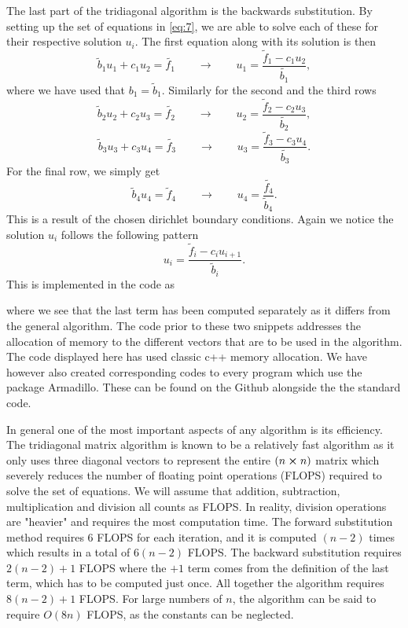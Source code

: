 \documentclass[a4paper,10pt]{article}
\begin{document}
The last part of the tridiagonal algorithm is the backwards substitution. By setting up the set of equations in \eqref{eq:7}, we are able to solve each of these for their respective solution $u_i$. The first equation along with its solution is then
\[
\tilde{b}_1 u_1 + c_1 u_2 = \tilde{f_1} \qquad \rightarrow \qquad u_1 = \frac{\tilde{f}_1 - c_1 u_2}{\tilde{b_1}},
\]
where we have used that $b_1 = \tilde{b}_1$. Similarly for the second and the third rows
\[
\tilde{b}_2 u_2 + c_2 u_3 = \tilde{f_2} \qquad \rightarrow \qquad u_2 = \frac{\tilde{f}_2 - c_2 u_3}{\tilde{b_2}},
\]
\[
\tilde{b}_3 u_3 + c_3 u_4 = \tilde{f_3} \qquad \rightarrow \qquad u_3 = \frac{\tilde{f}_3 - c_3 u_4}{\tilde{b_3}}.
\]
For the final row, we simply get
\[
\tilde{b}_4 u_4 = \tilde{f}_4 \qquad \rightarrow \qquad u_4 = \frac{\tilde{f_4}}{\tilde{b}_4}.
\]
This is a result of the chosen dirichlet boundary conditions. Again we notice the solution $u_i$ follows the following pattern
\begin{equation}\label{eq:9}
u_i = \frac{\tilde{f}_i - c_i u_{i+1}}{\tilde{b}_i}.
\end{equation}
\newpage
This is implemented in the code as

where we see that the last term has been computed separately as it differs from the general algorithm. The code prior to these two snippets addresses the allocation of memory to the different vectors that are to be used in the algorithm. The code displayed here has used classic c++ memory allocation. We have however also created corresponding codes to every program which use the package Armadillo. These can be found on the Github alongside the the standard code.

In general one of the most important aspects of any algorithm is its efficiency. The tridiagonal matrix algorithm is known to be a relatively fast algorithm as it only uses three diagonal vectors to represent the entire $(n \cross n)$ matrix which severely reduces the number of floating point operations (FLOPS) required to solve the set of equations. We will assume that addition, subtraction, multiplication and division all counts as FLOPS. In reality, division operations are "heavier" and requires the most computation time. The forward substitution method requires 6 FLOPS for each iteration, and it is computed $(n-2)$ times which results in a total of $6(n-2)$ FLOPS. The backward substitution requires $2(n-2) +1 $ FLOPS where the $+1$ term comes from the definition of the last term, which has to be computed just once. All together the algorithm requires $8(n-2) +1$ FLOPS. For large numbers of $n$, the algorithm can be said to require $O(8n)$ FLOPS, as the constants can be neglected.
\bigskip
\end{document}
